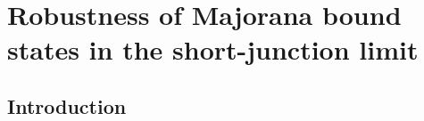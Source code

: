 \chapter{Robustness of Majorana bound states in the short-junction limit}
\label{ch:shortjunction}

\newpage
\noindent 
\section{Introduction}



